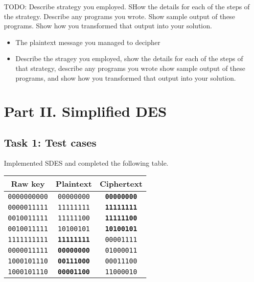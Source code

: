 \documentclass[a4paper,english,12pt]{article}
\begin{document}
TODO: Describe strategy you employed. SHow the details for each of the steps of
the strategy. Describe any programs you wrote. Show sample output of these
programs. Show how you transformed that output into your solution.

\begin{itemize}
  \item The plaintext message you managed to decipher
  \item Describe the stragey you employed, show the details for each of the
    steps of that strategy, describe any programs you wrote show sample output
    of these programs, and show how you transformed that output into your
    solution.
\end{itemize}

\section{Part II. Simplified DES}

\subsection{Task 1: Test cases}

Implemented SDES and completed the following table.

\begin{table}[H]
  \centering
  \begin{tabular}{ccc}
    \hline \textbf{Raw key} &
           \textbf{Plaintext} &
           \textbf{Ciphertext} \\
    \hline
    \texttt{0000000000} & \texttt{00000000} & \texttt{\textbf{00000000}} \\
    \texttt{0000011111} & \texttt{11111111} & \texttt{\textbf{11111111}} \\
    \texttt{0010011111} & \texttt{11111100} & \texttt{\textbf{11111100}} \\
    \texttt{0010011111} & \texttt{10100101} & \texttt{\textbf{10100101}} \\
    \texttt{1111111111} & \texttt{\textbf{11111111}} & \texttt{00001111} \\
    \texttt{0000011111} & \texttt{\textbf{00000000}} & \texttt{01000011} \\
    \texttt{1000101110} & \texttt{\textbf{00111000}} & \texttt{00011100} \\
    \texttt{1000101110} & \texttt{\textbf{00001100}} & \texttt{11000010} \\
    \hline
  \end{tabular}
  \label{table:task1}
\end{table}
\end{document}
